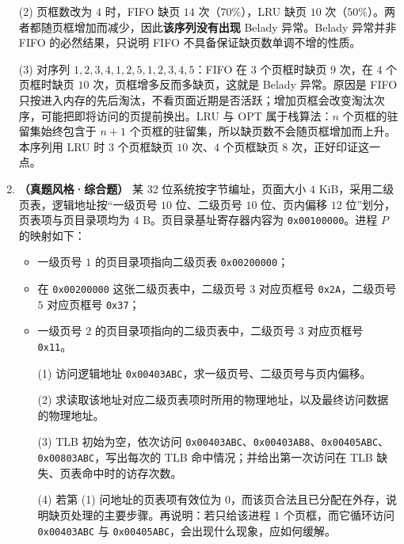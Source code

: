 \begin{enumerate}[start=7]
(2) 页框数改为 $4$ 时，FIFO 缺页 $14$ 次（$70\%$），LRU 缺页 $10$ 次（$50\%$）。两者都随页框增加而减少，因此\textbf{该序列没有出现} Belady 异常。Belady 异常并非 FIFO 的必然结果，只说明 FIFO 不具备保证缺页数单调不增的性质。

(3) 对序列 $1,2,3,4,1,2,5,1,2,3,4,5$：FIFO 在 $3$ 个页框时缺页 $9$ 次，在 $4$ 个页框时缺页 $10$ 次，页框增多反而多缺页，这就是 Belady 异常。原因是 FIFO 只按进入内存的先后淘汰，不看页面近期是否活跃；增加页框会改变淘汰次序，可能把即将访问的页提前换出。LRU 与 OPT 属于栈算法：$n$ 个页框的驻留集始终包含于 $n+1$ 个页框的驻留集，所以缺页数不会随页框增加而上升。本序列用 LRU 时 $3$ 个页框缺页 $10$ 次、$4$ 个页框缺页 $8$ 次，正好印证这一点。

\else \answerarea[12] \fi

\item \textbf{（真题风格·综合题）} 某 32 位系统按字节编址，页面大小 $4$ KiB，采用二级页表，逻辑地址按“一级页号 $10$ 位、二级页号 $10$ 位、页内偏移 $12$ 位”划分，页表项与页目录项均为 $4$ B。页目录基址寄存器内容为 \texttt{0x00100000}。进程 $P$ 的映射如下：
\begin{itemize}
\item 一级页号 $1$ 的页目录项指向二级页表 \texttt{0x00200000}；
\item 在 \texttt{0x00200000} 这张二级页表中，二级页号 $3$ 对应页框号 \texttt{0x2A}，二级页号 $5$ 对应页框号 \texttt{0x37}；
\item 一级页号 $2$ 的页目录项指向的二级页表中，二级页号 $3$ 对应页框号 \texttt{0x11}。
\end{itemize}
\begin{enumerate}
\item[(1)] 访问逻辑地址 \texttt{0x00403ABC}，求一级页号、二级页号与页内偏移。
\item[(2)] 求读取该地址对应二级页表项时所用的物理地址，以及最终访问数据的物理地址。
\item[(3)] TLB 初始为空，依次访问 \texttt{0x00403ABC}、\texttt{0x00403AB8}、\texttt{0x00405ABC}、\texttt{0x00803ABC}，写出每次的 TLB 命中情况；并给出第一次访问在 TLB 缺失、页表命中时的访存次数。
\item[(4)] 若第 (1) 问地址的页表项有效位为 $0$，而该页合法且已分配在外存，说明缺页处理的主要步骤。再说明：若只给该进程 $1$ 个页框，而它循环访问 \texttt{0x00403ABC} 与 \texttt{0x00405ABC}，会出现什么现象，应如何缓解。
\end{enumerate}


\end{enumerate}
